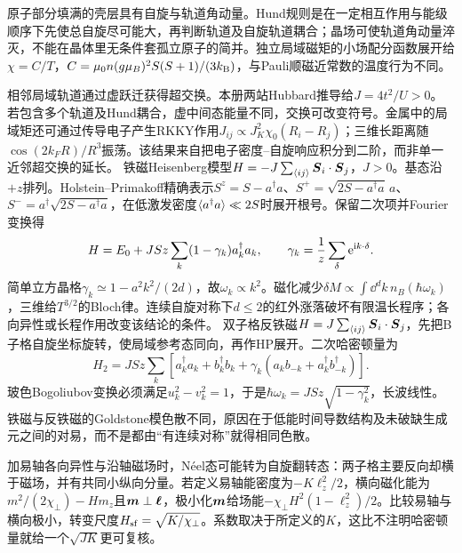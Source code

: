 \label{ch:magnet}
原子部分填满的壳层具有自旋与轨道角动量。Hund规则是在一定相互作用与能级顺序下先使总自旋尽可能大，再判断轨道及自旋轨道耦合；晶场可使轨道角动量淬灭，不能在晶体里无条件套孤立原子的简并。独立局域磁矩的小场配分函数展开给$\chi=C/T$，$C=\mu_0n(g\mu_B)^2S(S+1)/(3k_{\mathrm B})$，与Pauli顺磁近常数的温度行为不同。

相邻局域轨道通过虚跃迁获得超交换。本册两站Hubbard推导给$J=4t^2/U>0$。若包含多个轨道及Hund耦合，虚中间态能量不同，交换可改变符号。金属中的局域矩还可通过传导电子产生RKKY作用$J_{ij}\propto J_K^2\chi_0(R_i-R_j)$；三维长距离随$\cos(2k_FR)/R^3$振荡。该结果来自把电子密度--自旋响应积分到二阶，而非单一近邻超交换的延长。
铁磁Heisenberg模型$H=-J\sum_{\langle ij\rangle}\boldsymbol{S}_i\cdot\boldsymbol{S}_j$，$J>0$。基态沿$+z$排列。Holstein--Primakoff精确表示$S^z=S-a^\dagger a$、$S^+=\sqrt{2S-a^\dagger a}\,a$、$S^-=a^\dagger\sqrt{2S-a^\dagger a}$，在低激发密度$\langle a^\dagger a\rangle\ll2S$时展开根号。保留二次项并Fourier变换得
\begin{equation}
H=E_0+JSz\sum_k(1-\gamma_k)a_k^\dagger a_k,\qquad\gamma_k=\frac1z\sum_\delta\mathrm e^{\mathrm i k\cdot\delta}.
\end{equation}
简单立方晶格$\gamma_k\simeq1-a^2k^2/(2d)$，故$\omega_k\propto k^2$。磁化减少$\delta M\propto\int\dd^dk\,n_B(\hbar\omega_k)$，三维给$T^{3/2}$的Bloch律。连续自旋对称下$d\le2$的红外涨落破坏有限温长程序；各向异性或长程作用改变该结论的条件。
双子格反铁磁$H=J\sum_{\langle ij\rangle}\boldsymbol{S}_i\cdot\boldsymbol{S}_j$，先把B子格自旋坐标旋转，使局域参考态同向，再作HP展开。二次哈密顿量为
\begin{equation}
H_2=JSz\sum_k[a_k^\dagger a_k+b_k^\dagger b_k+\gamma_k(a_kb_{-k}+a_k^\dagger b_{-k}^\dagger)].
\end{equation}
玻色Bogoliubov变换必须满足$u_k^2-v_k^2=1$，于是$\hbar\omega_k=JSz\sqrt{1-\gamma_k^2}$，长波线性。铁磁与反铁磁的Goldstone模色散不同，原因在于低能时间导数结构及未破缺生成元之间的对易，而不是都由“有连续对称”就得相同色散。

加易轴各向异性与沿轴磁场时，Néel态可能转为自旋翻转态：两子格主要反向却横于磁场，并有共同小纵向分量。若定义易轴能密度为$-K\ell_z^2/2$，横向磁化能为$m^2/(2\chi_\perp)-Hm_z$且$\boldsymbol{m}\perp\boldsymbol{\ell}$，极小化$\boldsymbol{m}$给场能$-\chi_\perp H^2(1-\ell_z^2)/2$。比较易轴与横向极小，转变尺度$H_{\rm sf}=\sqrt{K/\chi_\perp}$。系数取决于所定义的$K$，这比不注明哈密顿量就给一个$\sqrt{JK}$更可复核。

